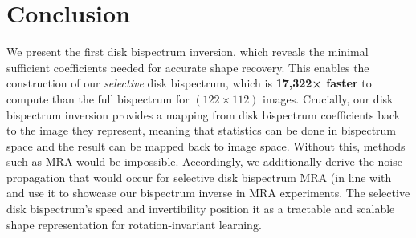 \section*{Conclusion}

We present the first disk bispectrum inversion, which reveals the minimal sufficient coefficients needed for accurate shape recovery. This enables the construction of our \emph{selective} disk bispectrum, which is \textbf{17,322× faster} to compute than the full bispectrum for $(122\times112)$ images. Crucially, our disk bispectrum inversion provides a mapping from disk bispectrum coefficients back to the image they represent, meaning that statistics can be done in bispectrum space and the result can be mapped back to image space. Without this, methods such as MRA would be impossible. Accordingly, we additionally derive the noise propagation that would occur for selective disk bispectrum MRA (in line with \cite{bendory2018bispectrum} and use it to showcase our bispectrum inverse in MRA experiments. The selective disk bispectrum's speed and invertibility position it as a tractable and scalable shape representation for rotation-invariant learning.
